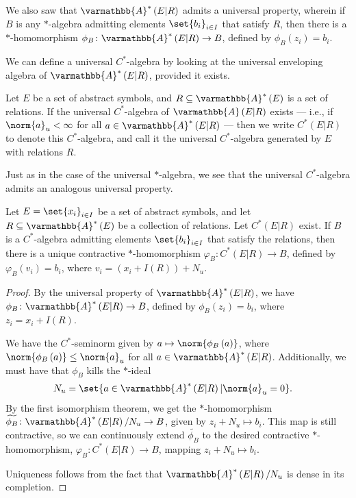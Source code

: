 \documentclass[10pt]{mypackage}
\renewcommand*{\mathbb}[1]{\varmathbb{#1}}
\newcommand{\A}{\mathbb{A}}
\begin{document}
We also saw that $\A^{\ast}\left(E|R\right)$ admits a universal property, wherein if $B$ is any $\ast$-algebra admitting elements $\set{b_i}_{i\in I}$ that satisfy $R$, then there is a $\ast$-homomorphism $\phi_B\colon \A^{\ast}\left(E|R\right) \rightarrow B$, defined by $\phi_B\left(z_i\right) = b_i$.\newline

We can define a universal $C^{\ast}$-algebra by looking at the universal enveloping algebra of $\A^{\ast}\left(E|R\right)$, provided it exists.
\begin{definition}
  Let $E$ be a set of abstract symbols, and $R\subseteq \A^{\ast}\left(E\right)$ is a set of relations. If the universal $C^{\ast}$-algebra of $\A\left(E|R\right)$ exists --- i.e., if $\norm{a}_u < \infty$ for all $a\in \A^{\ast}\left(E|R\right)$ --- then we write $C^{\ast}\left(E|R\right)$ to denote this $C^{\ast}$-algebra, and call it the universal $C^{\ast}$-algebra generated by $E$ with relations $R$.
\end{definition}
Just as in the case of the universal $\ast$-algebra, we see that the universal $C^{\ast}$-algebra admits an analogous universal property.
\begin{proposition}
  Let $E = \set{x_i}_{i\in I}$ be a set of abstract symbols, and let $R\subseteq \A^{\ast}\left(E\right)$ be a collection of relations. Let $C^{\ast}\left(E|R\right)$ exist. If $B$ is a $C^{\ast}$-algebra admitting elements $\set{b_i}_{i\in I}$ that satisfy the relations, then there is a unique contractive $\ast$-homomorphism $\varphi_B\colon C^{\ast}\left(E|R\right) \rightarrow B$, defined by $\varphi_B\left(v_i\right) = b_i$, where $v_i = \left(x_i + I(R)\right) + N_u$.
\end{proposition}
\begin{proof}
  By the universal property of $\A^{\ast}\left(E|R\right)$, we have $\phi_B\colon \A^{\ast}\left(E|R\right) \rightarrow B$, defined by $\phi_B\left(z_i\right) = b_i$, where $z_i = x_i + I(R)$.\newline

  We have the $C^{\ast}$-seminorm given by $a\mapsto \norm{\phi_B\left(a\right)}$, where $\norm{\phi_B\left(a\right)} \leq \norm{a}_u$ for all $a\in \A^{\ast}\left(E|R\right)$. Additionally, we must have that $\phi_B$ kills the $\ast$-ideal
  \begin{align*}
    N_u &= \set{a\in \A^{\ast}\left(E\vert R\right) | \norm{a}_u = 0}.
  \end{align*}
  By the first isomorphism theorem, we get the $\ast$-homomorphism $\widetilde{\phi_B}\colon \A^{\ast}\left(E|R\right)/N_u\rightarrow B$, given by $z_i + N_u \mapsto b_i$. This map is still contractive, so we can continuously extend $\widetilde{\phi_B}$ to the desired contractive $\ast$-homomorphism, $\varphi_B \colon C^{\ast}\left(E|R\right)\rightarrow B$, mapping $z_i + N_u \mapsto b_i$.\newline

  Uniqueness follows from the fact that $\A^{\ast}\left(E|R\right)/N_u$ is dense in its completion.
\end{proof}
\end{document}
